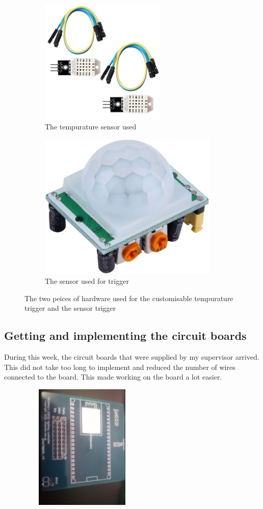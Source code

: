 \begin{figure}[h]
\begin{subfigure}{0.5\textwidth}
\includegraphics[width=0.9\linewidth, height=6cm]{TempSensor}
\caption{The tempurature sensor used}
\end{subfigure}
\begin{subfigure}{0.5\textwidth}
\includegraphics[width=0.9\linewidth, height=7cm]{SensorSensor}
\caption{The sensor used for trigger}
\end{subfigure}
\caption{The two peices of hardware used for the customisable tempurature trigger and the sensor trigger}
\end{figure}

\subsection {Getting and implementing the circuit  boards}
During this week, the circuit boards that were supplied by my supervisor arrived. This did not take too long to implement and reduced the number of wires connected to the board. This made working on the board a lot easier.

\begin{figure}[h]
\centering
\includegraphics[width=6cm, height=6cm]{CircuitBoard}
\end{figure}


